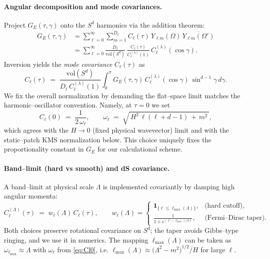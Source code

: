 \documentclass[10pt]{article}
\theoremstyle{definition}
\theoremstyle{plain}
\begin{document}
\paragraph{Angular decomposition and mode covariances.}\label{par:uom-main-237}
Project $G_E(\tau,\gamma)$ onto the $S^d$ harmonics via the addition theorem:
\begin{align*}
G_E(\tau,\gamma)
&= \sum_{\ell=0}^{\infty}\sum_{m=1}^{D_\ell} C_\ell(\tau)\,
Y_{\ell m}(\Omega)\,\overline{Y_{\ell m}(\Omega')}\\[-2pt]
&= \sum_{\ell=0}^{\infty} \frac{D_\ell}{\mathrm{vol}(S^d)}\,
\frac{C_\ell(\tau)}{C_\ell^{(\lambda)}(1)}\,C_\ell^{(\lambda)}(\cos\gamma).
\end{align*}
Inversion yields the \emph{mode covariance} $C_\ell(\tau)$ as
\[
C_\ell(\tau)\;=\;\frac{\mathrm{vol}(S^d)}{D_\ell\,C_\ell^{(\lambda)}(1)}
\int_0^\pi \!G_E(\tau,\gamma)\,C_\ell^{(\lambda)}(\cos\gamma)\,\sin^{d-1}\gamma\,
d\gamma.
\]
We fix the overall normalization by demanding the flat–space limit matches the
harmonic–oscillator convention. Namely, at $\tau=0$ we set
\begin{equation}
C_\ell(0)\;=\;\frac{1}{2\,\omega_\ell},
\qquad
\omega_\ell\;=\;\sqrt{\,H^2\,\ell(\ell+d-1)\,+\,m^2\,},
\label{eq:Cl0}
\end{equation}
which agrees with the $H\to0$ (fixed physical wavevector) limit and with the
static–patch KMS normalization below. This choice uniquely fixes the proportionality
constant in $G_E$ for our calculational scheme.

\paragraph{Band–limit (hard vs smooth) and dS covariance.}\label{par:uom-main-238}
A band–limit at physical scale $\Lambda$ is implemented covariantly by damping
high angular momenta:
\[
C_\ell^{(\Lambda)}(\tau)\;=\;w_\ell(\Lambda)\,C_\ell(\tau),
\qquad
w_\ell(\Lambda)=
\begin{cases}
\mathbf 1_{\{\ell\le \ell_{\max}(\Lambda)\}}, &\text{(hard cutoff),}\\[3pt]
\displaystyle\frac{1}{1+e^{(\ell-\ell_{\max})/\delta\ell}}, &\text{(Fermi–Dirac taper).}
\end{cases}
\]
Both choices preserve rotational covariance on $S^d$; the taper avoids Gibbs–type
ringing, and we use it in numerics. The mapping $\ell_{\max}(\Lambda)$ can be
taken as $\omega_{\ell_{\max}}\approx \Lambda$ with $\omega_\ell$ from
\eqref{eq:Cl0}, i.e.
$\ell_{\max}(\Lambda)\approx \bigl(\Lambda^2-m^2\bigr)^{1/2}/H$ for large $\ell$.
\end{document}
